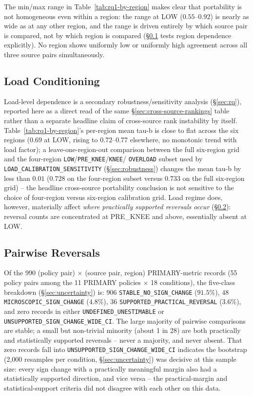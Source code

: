 \documentclass[sn-basic,Numbered,pdflatex]{sn-jnl}
\begin{document}
The min/max range in Table~\ref{tab:rq1-by-region} makes clear that
portability is not homogeneous even within a region: the range at LOW
($0.55$--$0.92$) is nearly as wide as at any other region, and the range is
driven entirely by which source pair is compared, not by which region is
compared (\S\ref{sec:load-conditioning} tests region dependence
explicitly). No region shows uniformly low or uniformly high agreement
across all three source pairs simultaneously.

\subsection{Load Conditioning}
\label{sec:load-conditioning}

Load-level dependence is a secondary robustness/sensitivity analysis
(\S\ref{sec:rq}), reported here as a direct read of the same
\S\ref{sec:cross-source-rankings} table rather than a separate headline
claim of cross-source rank instability by itself. Table~\ref{tab:rq1-by-region}'s
per-region mean tau-b is close to flat across the six regions ($0.69$ at
LOW, rising to $0.72$--$0.77$ elsewhere, no monotonic trend with load
factor); a leave-one-region-out comparison between the full six-region
grid and the four-region \texttt{LOW}/\texttt{PRE\_KNEE}/\texttt{KNEE}/
\texttt{OVERLOAD} subset used by \texttt{LOAD\_CALIBRATION\_SENSITIVITY}
(\S\ref{sec:robustness}) changes the mean tau-b by less than $0.01$
($0.728$ on the four-region subset versus $0.733$ on the full six-region
grid) -- the headline cross-source portability conclusion is not sensitive
to the choice of four-region versus six-region calibration grid. Load
regime does, however, materially affect \emph{where practically supported
reversals occur} (\S\ref{sec:reversals}): reversal counts are concentrated
at PRE\_KNEE and above, essentially absent at LOW.

\subsection{Pairwise Reversals}
\label{sec:reversals}

Of the 990 (policy pair) $\times$ (source pair, region) PRIMARY-metric
records (55 policy pairs among the 11 PRIMARY policies $\times$ 18
conditions), the
five-class breakdown (\S\ref{sec:uncertainty}) is: $906$
\texttt{STABLE\_NO\_SIGN\_CHANGE} ($91.5\%$), $48$
\texttt{MICROSCOPIC\_SIGN\_CHANGE} ($4.8\%$), $36$
\texttt{SUPPORTED\_PRACTICAL\_REVERSAL} ($3.6\%$), and zero records in
either \texttt{UNDEFINED\_UNESTIMABLE} or
\texttt{UNSUPPORTED\_SIGN\_CHANGE\_WIDE\_CI}. The large majority of
pairwise comparisons are stable; a small but non-trivial minority (about 1
in 28) are both practically and statistically supported reversals -- never
a majority, and never absent. That zero records fall into
\texttt{UNSUPPORTED\_SIGN\_CHANGE\_WIDE\_CI} indicates the bootstrap
(2{,}000 resamples per condition, \S\ref{sec:uncertainty}) was decisive at
this sample size: every sign change with a practically meaningful margin
also had a statistically supported direction, and vice versa -- the
practical-margin and statistical-support criteria did not disagree with
each other on this data.
\end{document}
